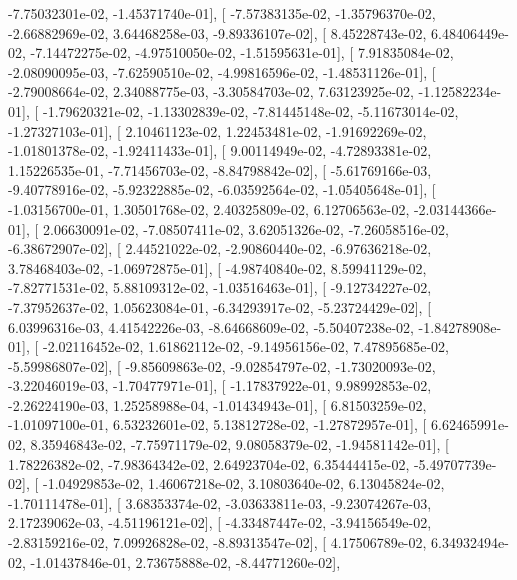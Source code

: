 \documentclass{article}
\begin{document}
         -7.75032301e-02,  -1.45371740e-01],
       [ -7.57383135e-02,  -1.35796370e-02,  -2.66882969e-02,
          3.64468258e-03,  -9.89336107e-02],
       [  8.45228743e-02,   6.48406449e-02,  -7.14472275e-02,
         -4.97510050e-02,  -1.51595631e-01],
       [  7.91835084e-02,  -2.08090095e-03,  -7.62590510e-02,
         -4.99816596e-02,  -1.48531126e-01],
       [ -2.79008664e-02,   2.34088775e-03,  -3.30584703e-02,
          7.63123925e-02,  -1.12582234e-01],
       [ -1.79620321e-02,  -1.13302839e-02,  -7.81445148e-02,
         -5.11673014e-02,  -1.27327103e-01],
       [  2.10461123e-02,   1.22453481e-02,  -1.91692269e-02,
         -1.01801378e-02,  -1.92411433e-01],
       [  9.00114949e-02,  -4.72893381e-02,   1.15226535e-01,
         -7.71456703e-02,  -8.84798842e-02],
       [ -5.61769166e-03,  -9.40778916e-02,  -5.92322885e-02,
         -6.03592564e-02,  -1.05405648e-01],
       [ -1.03156700e-01,   1.30501768e-02,   2.40325809e-02,
          6.12706563e-02,  -2.03144366e-01],
       [  2.06630091e-02,  -7.08507411e-02,   3.62051326e-02,
         -7.26058516e-02,  -6.38672907e-02],
       [  2.44521022e-02,  -2.90860440e-02,  -6.97636218e-02,
          3.78468403e-02,  -1.06972875e-01],
       [ -4.98740840e-02,   8.59941129e-02,  -7.82771531e-02,
          5.88109312e-02,  -1.03516463e-01],
       [ -9.12734227e-02,  -7.37952637e-02,   1.05623084e-01,
         -6.34293917e-02,  -5.23724429e-02],
       [  6.03996316e-03,   4.41542226e-03,  -8.64668609e-02,
         -5.50407238e-02,  -1.84278908e-01],
       [ -2.02116452e-02,   1.61862112e-02,  -9.14956156e-02,
          7.47895685e-02,  -5.59986807e-02],
       [ -9.85609863e-02,  -9.02854797e-02,  -1.73020093e-02,
         -3.22046019e-03,  -1.70477971e-01],
       [ -1.17837922e-01,   9.98992853e-02,  -2.26224190e-03,
          1.25258988e-04,  -1.01434943e-01],
       [  6.81503259e-02,  -1.01097100e-01,   6.53232601e-02,
          5.13812728e-02,  -1.27872957e-01],
       [  6.62465991e-02,   8.35946843e-02,  -7.75971179e-02,
          9.08058379e-02,  -1.94581142e-01],
       [  1.78226382e-02,  -7.98364342e-02,   2.64923704e-02,
          6.35444415e-02,  -5.49707739e-02],
       [ -1.04929853e-02,   1.46067218e-02,   3.10803640e-02,
          6.13045824e-02,  -1.70111478e-01],
       [  3.68353374e-02,  -3.03633811e-03,  -9.23074267e-03,
          2.17239062e-03,  -4.51196121e-02],
       [ -4.33487447e-02,  -3.94156549e-02,  -2.83159216e-02,
          7.09926828e-02,  -8.89313547e-02],
       [  4.17506789e-02,   6.34932494e-02,  -1.01437846e-01,
          2.73675888e-02,  -8.44771260e-02],
\end{document}

